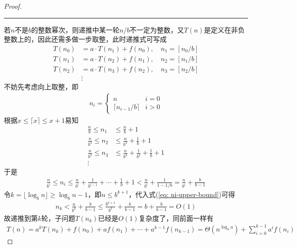 \documentclass{ctexart}
\begin{document}
\begin{proof}
    \noindent \rule[0.25\baselineskip]{\textwidth}{0.5pt}

    若$n$不是$b$的整数幂次，则递推中某一轮$n/b$不一定为整数，又$T(n)$是定义在非负整数上的，因此还需多做一步取整，此时递推式可写成
    \begin{align*}
        T(n_0) & = a \cdot T(n_1) + f(n_0), \quad n_1 = [n_0/b] \\
        T(n_1) & = a \cdot T(n_2) + f(n_1), \quad n_2 = [n_1/b] \\
        T(n_2) & = a \cdot T(n_3) + f(n_2), \quad n_3 = [n_2/b] \\
               & \vdots
    \end{align*}
    不妨先考虑向上取整，即
    \begin{align*}
        n_i = \begin{cases}
                  n & i = 0 \\ \lceil n_{i-1} / b \rceil & i > 0
              \end{cases}
    \end{align*}
    根据$x \le \lceil x \rceil \le x + 1$易知
    \begin{align*}
        \frac{n}{b}   \le n_1 & \le \frac{n}{b} + 1                                 \\
        \frac{n}{b^2} \le n_2 & \le \frac{n}{b^2} + \frac{1}{b} + 1                 \\
        \frac{n}{b^3} \le n_3 & \le \frac{n}{b^3} + \frac{1}{b^2} + \frac{1}{b} + 1 \\
        \vdots                &
    \end{align*}
    于是
    \begin{align} \label{eq: ni-upper-bound}
        \frac{n}{b^i} \le n_i \le \frac{n}{b^i} + \frac{1}{b^{i-1}} + \cdots + \frac{1}{b} + 1 < \frac{n}{b^i} + \frac{1}{1 - 1/b} = \frac{n}{b^i} + \frac{b}{b-1}
    \end{align}
    令$k = \lfloor \log_b n \rfloor \ge \log_b n - 1$，即$n \le b^{k+1}$，代入式(\ref{eq: ni-upper-bound})可得
    \begin{align*}
        n_k < \frac{n}{b^k} + \frac{b}{b-1} \le \frac{b^{k+1}}{b^k} + \frac{b}{b-1} = b + \frac{b}{b-1} = O(1)
    \end{align*}
    故递推到第$k$轮，子问题$T(n_k)$已经是$O(1)$复杂度了，同前面一样有
    \begin{align*}
        T(n) = a^k T(n_k) + f(n_0) + a f(n_1) + \cdots + a^{k-1} f(n_{k-1}) = \Theta(n^{\log_b a}) + \sum_{i=0}^{k-1} a^i f(n_i)
    \end{align*}

\end{proof}
\end{document}
